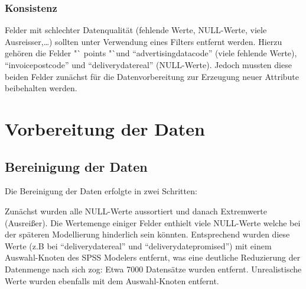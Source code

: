 \documentclass[a4paper,12pt]{article}
\begin{document}
\subsubsection{Konsistenz}
Felder mit schlechter Datenqualität (fehlende Werte, NULL-Werte, viele Ausreisser,\ldots) sollten unter Verwendung eines Filters entfernt werden.
Hierzu gehören die Felder "` points "`und "`advertisingdatacode"' (viele fehlende Werte), "`invoicepostcode"' und "`deliverydatereal"' (NULL-Werte).
Jedoch mussten diese beiden Felder zunächst für die Datenvorbereitung zur Erzeugung neuer Attribute beibehalten werden.

\section{Vorbereitung der Daten}
\subsection{Bereinigung der Daten}
Die Bereinigung der Daten erfolgte in zwei Schritten: {\color{red}{wie wurde aussortiert??}}
\par
Zunächst wurden alle NULL-Werte aussortiert und danach Extremwerte (Ausreißer).
Die Wertemenge einiger Felder enthielt viele NULL-Werte welche bei der späteren Modellierung hinderlich sein könnten.
Entsprechend wurden diese Werte (z.B bei "`deliverydatereal"' und "`deliverydatepromised"') mit einem Auswahl-Knoten des SPSS Modelers entfernt, 
was eine deutliche Reduzierung der Datenmenge nach sich zog: Etwa 7000 Datensätze  wurden entfernt.
Unrealistische Werte wurden ebenfalls mit dem Auswahl-Knoten entfernt.
\end{document}
